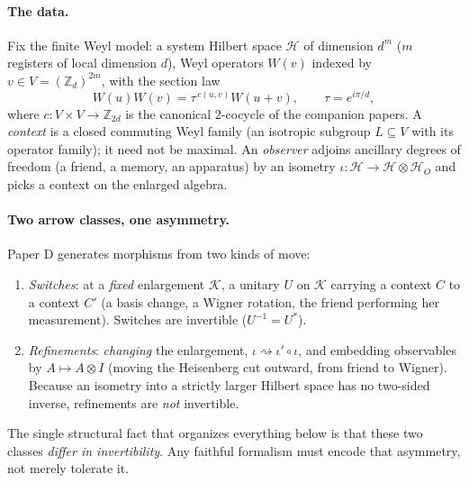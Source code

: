 \documentclass[11pt]{article}
\theoremstyle{definition}
\theoremstyle{remark}
\newcommand{\Hs}{\mathcal H}
\newcommand{\K}{\mathcal K}
\newcommand{\Wop}{W}
\begin{document}
\paragraph{The data.}
Fix the finite Weyl model: a system Hilbert space $\Hs$ of dimension $d^m$
($m$ registers of local dimension $d$), Weyl operators $\Wop(v)$ indexed by
$v\in V=(\mathbb Z_d)^{2m}$, with the section law
\begin{equation}\label{eq:weyl}
\Wop(u)\Wop(v)=\tau^{\,c(u,v)}\Wop(u+v),\qquad \tau=e^{i\pi/d},
\end{equation}
where $c:V\times V\to\mathbb Z_{2d}$ is the canonical $2$-cocycle of the companion
papers. A \emph{context} is a closed commuting Weyl family (an isotropic subgroup
$L\subseteq V$ with its operator family); it need not be maximal. An \emph{observer}
adjoins ancillary degrees of freedom (a friend, a memory, an apparatus) by an isometry
$\iota:\Hs\to\Hs\otimes\Hs_O$ and picks a context on the enlarged algebra.

\paragraph{Two arrow classes, one asymmetry.}
Paper D generates morphisms from two kinds of move:
\begin{enumerate}[label=(\alph*),leftmargin=2em]
\item \emph{Switches}: at a \emph{fixed} enlargement $\K$, a unitary $U$ on $\K$
carrying a context $C$ to a context $C'$ (a basis change, a Wigner rotation, the
friend performing her measurement). Switches are invertible ($U^{-1}=U^\ast$).
\item \emph{Refinements}: \emph{changing} the enlargement, $\iota\rightsquigarrow
\iota'\circ\iota$, and embedding observables by $A\mapsto A\otimes I$ (moving the
Heisenberg cut outward, from friend to Wigner). Because an isometry into a strictly
larger Hilbert space has no two-sided inverse, refinements are \emph{not} invertible.
\end{enumerate}
The single structural fact that organizes everything below is that these two classes
\emph{differ in invertibility}. Any faithful formalism must encode that asymmetry, not
merely tolerate it.
\end{document}

